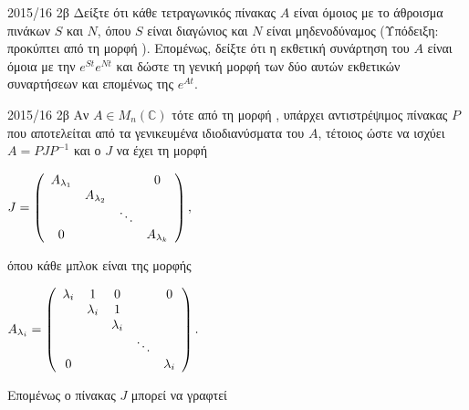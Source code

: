 \documentclass[a4paper,11pt]{article}
\begin{document}
\begin{exercise}{2015/16 2β}
    Δείξτε ότι κάθε τετραγωνικός πίνακας \( A \) είναι όμοιος με το άθροισμα
    πινάκων \( S \) και \( N \), όπου \( S \) είναι διαγώνιος και \( N \) είναι
    μηδενοδύναμος (Υπόδειξη: προκύπτει από τη μορφή ). Επομένως,
    δείξτε ότι η εκθετική συνάρτηση του \( A \) είναι όμοια με την \(
    e^{St}e^{Nt} \) και δώστε τη γενική μορφή των δύο αυτών εκθετικών συναρτήσεων
    και επομένως της \( e^{At} \).
\end{exercise}
\begin{solution}{2015/16 2β}
    Αν \( A \in M_n(\mathbb{C}) \) τότε από τη μορφή , υπάρχει
    αντιστρέψιμος πίνακας \( P \) που αποτελείται από τα γενικευμένα
    ιδιοδιανύσματα του \( A \), τέτοιος ώστε να ισχύει \( A  = PJP^{-1}
    \) και ο \( J \) να έχει τη μορφή
    \begin{center}
        \(
            J =
            \left(
                \begin{array}{*4{c}}
                    A_{\lambda_1} &               &        & 0\\
                    & A_{\lambda_2} &        &  \\
                    &               & \ddots &  \\
                    0          &               &        & A_{\lambda_k}
                \end{array}
            \right),
        \)
    \end{center}
    όπου κάθε μπλοκ είναι της μορφής
    \begin{center}
        \(
            A_{\lambda_i} =
            \left(
                \begin{array}{*5{c}}
                    \lambda_i     &     1         &    0      &         &  0        \\
                    & \lambda_i     &    1      &         &           \\
                    &               & \lambda_i &         &           \\
                    &               &           &  \ddots &           \\
                    0          &               &           &         & \lambda_i  \\
                \end{array}
            \right).
        \)
    \end{center}
    Επομένως ο πίνακας \( J \) μπορεί να γραφτεί
    \begin{equation*}

\end{equation*}
\end{solution}
\end{document}
